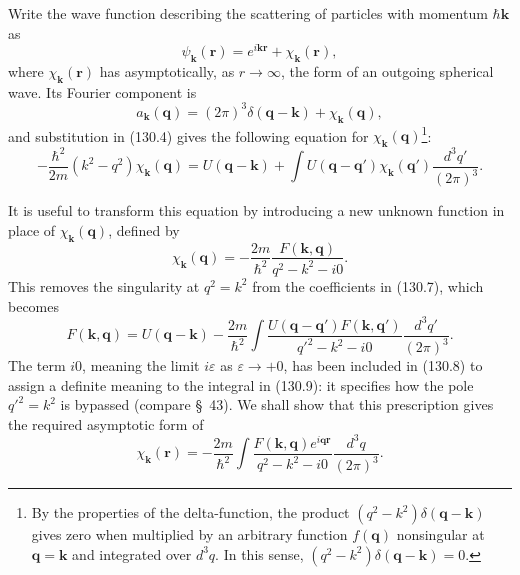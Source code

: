 Write the wave function describing the scattering of particles with momentum
$\hbar\mathbf k$ as
\begin{equation}
 \psi_{\mathbf k}(\mathbf r)=e^{i\mathbf{kr}}+\chi_{\mathbf k}(\mathbf r),
 \tag{130.5}
\end{equation}
where $\chi_{\mathbf k}(\mathbf r)$ has asymptotically, as $r\to\infty$, the
form of an outgoing spherical wave. Its Fourier component is
\begin{equation}
 a_{\mathbf k}(\mathbf q)=(2\pi)^3\delta(\mathbf q-\mathbf k)
 +\chi_{\mathbf k}(\mathbf q),
 \tag{130.6}
\end{equation}
and substitution in (130.4) gives the following equation for
$\chi_{\mathbf k}(\mathbf q)$\footnote{By the properties of the
delta-function, the product $(q^2-k^2)\delta(\mathbf q-\mathbf k)$ gives zero
when multiplied by an arbitrary function $f(\mathbf q)$ nonsingular at
$\mathbf q=\mathbf k$ and integrated over $d^3q$. In this sense,
$(q^2-k^2)\delta(\mathbf q-\mathbf k)=0$.}:
\begin{equation}
 -\frac{\hbar^2}{2m}(k^2-q^2)\chi_{\mathbf k}(\mathbf q)
 =U(\mathbf q-\mathbf k)+\int U(\mathbf q-\mathbf q')
 \chi_{\mathbf k}(\mathbf q')\frac{d^3q'}{(2\pi)^3}.
 \tag{130.7}
\end{equation}

It is useful to transform this equation by introducing a new unknown function
in place of $\chi_{\mathbf k}(\mathbf q)$, defined by
\begin{equation}
 \chi_{\mathbf k}(\mathbf q)=-\frac{2m}{\hbar^2}
 \frac{F(\mathbf k,\mathbf q)}{q^2-k^2-i0}.
 \tag{130.8}
\end{equation}
This removes the singularity at $q^2=k^2$ from the coefficients in (130.7),
which becomes
\begin{equation}
 F(\mathbf k,\mathbf q)=U(\mathbf q-\mathbf k)-\frac{2m}{\hbar^2}
 \int\frac{U(\mathbf q-\mathbf q')F(\mathbf k,\mathbf q')}
 {q'^2-k^2-i0}\frac{d^3q'}{(2\pi)^3}.
 \tag{130.9}
\end{equation}
The term $i0$, meaning the limit $i\varepsilon$ as $\varepsilon\to+0$, has
been included in (130.8) to assign a definite meaning to the integral in
(130.9): it specifies how the pole $q'^2=k^2$ is bypassed (compare \S~43). We
shall show that this prescription gives the required asymptotic form of
\begin{equation}
 \chi_{\mathbf k}(\mathbf r)=-\frac{2m}{\hbar^2}\int
 \frac{F(\mathbf k,\mathbf q)e^{i\mathbf{qr}}}{q^2-k^2-i0}
 \frac{d^3q}{(2\pi)^3}.
 \tag{130.10}
\end{equation}

